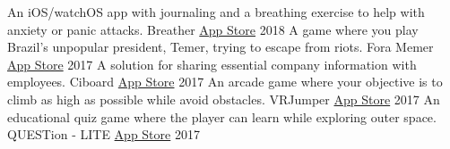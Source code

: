 

\begin{cventries}
  \cvcompactentry
    {An iOS/watchOS app with journaling and a breathing exercise to help with anxiety or panic attacks.}
    {Breather}
    {\href{https://itunes.apple.com/app/id1370659046?mt=8}{App Store}}
    {2018}
  \cvcompactentry
    {A game where you play Brazil's unpopular president, Temer, trying to escape from riots.}
    {Fora Memer}
    {\href{https://itunes.apple.com/br/app/fora-memer/id1253655537?l=en&mt=8}{App Store}}
    {2017}
  \cvcompactentry
    {A solution for sharing essential company information with employees.}
    {Ciboard}
    {\href{https://itunes.apple.com/app/id1293364926?mt=8}{App Store}}
    {2017}
  \cvcompactentry
    {An arcade game where your objective is to climb as high as possible while avoid obstacles.}
    {VRJumper}
    {\href{https://itunes.apple.com/app/id1262625055?mt=8}{App Store}}
    {2017}
  \cvcompactentry
    {An educational quiz game where the player can learn while exploring outer space.}
    {QUESTion - LITE}
    {\href{https://itunes.apple.com/app/id1233411790?mt=8}{App Store}}
    {2017}
\end{cventries}

